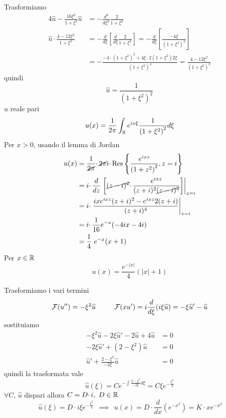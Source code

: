 Trasformiamo
\begin{align*}
4\hat{u} -\frac{16\xi ^{2}}{1+\xi ^{2}}\hat{u} & =-\frac{d^{2}}{d\xi ^{2}}\frac{2}{1+\xi ^{2}}\\
\hat{u} \cdotp \frac{4-12\xi ^{2}}{1+\xi ^{2}} & =-\frac{d}{d\xi }\left[\frac{d}{d\xi }\frac{2}{1+\xi ^{2}}\right] =-\frac{d}{d\xi }\left[\frac{-4\xi }{\left( 1+\xi ^{2}\right)^{2}}\right]\\
 & =-\frac{-4\cdotp \left( 1+\xi ^{2}\right)^{2} +4\xi \cdotp 2\left( 1+\xi ^{2}\right) 2\xi }{\left( 1+\xi ^{2}\right)^{4}} =\frac{4-12\xi ^{2}}{\left( 1+\xi ^{2}\right)^{3}}
\end{align*}
quindi
\begin{equation*}
\hat{u} =\frac{1}{\left( 1+\xi ^{2}\right)^{2}}
\end{equation*}
$\hat{u}$ reale pari
\begin{equation*}
u( x) =\frac{1}{2\pi }\int _{\mathbb{R} } e^{ix\xi }\frac{1}{\left( 1+\xi ^{2}\right)^{2}} d\xi 
\end{equation*}
Per $x >0$, usando il lemma di Jordan
\begin{align*}
u( x) & =\frac{1}{\cancel{2\pi }} \cdotp \cancel{2\pi } i\cdotp \operatorname{Res} \left\{\frac{e^{ixz}}{\left( 1+z^{2}\right)^{2}} ,z=i\right\}\\
 & =i\cdotp \frac{d}{dz}\left. \left[\cancel{( z-i)^{2}} \cdotp \frac{e^{ixz}}{( z+i)^{2}\cancel{( z-i)^{2}}}\right]\right| _{z=i}\\
 & =i\cdotp \left. \frac{ixe^{ixz}( z+i)^{2} -e^{ixz} 2( z+i)}{( z+i)^{4}}\right| _{z=i}\\
 & =i\cdotp \frac{1}{16} e^{-x}( -4ix-4i)\\
 & =\frac{1}{4} \ e^{-x}( x+1)
\end{align*}
Per $x\in \mathbb{R} $
\begin{equation*}
u( x) =\frac{e^{-| x| }}{4}(| x| +1)
\end{equation*}
\Soluzione

Trasformiamo i vari termini
\begin{equation*}
\mathcal{F} ( u'') =-\xi ^{2}\widehat{u} \ \ \ \ \ \ \ \ \mathcal{F} ( xu') =i\frac{d}{d\xi }( i\xi \widehat{u}) =-\xi \widehat{u} '-\widehat{u}
\end{equation*}
sostituiamo
\begin{align*}
-\xi ^{2}\hat{u} -2\xi \hat{u} '-2\hat{u} +4\hat{u} & =0\\
-2\xi \hat{u} '+\left( 2-\xi ^{2}\right)\hat{u} & =0\\
\hat{u} '+\frac{2-\xi ^{2}}{-2\xi }\hat{u} & =0
\end{align*}
quindi la trasformata vale
\begin{equation*}
\hat{u}( \xi ) =Ce^{-\int \frac{2-\xi ^{2}}{-2\xi } d\xi } =C\xi e^{-\frac{\xi ^{2}}{4}}
\end{equation*}
$\forall C$, $\hat{u}$ dispari allora $C=D\cdotp i,\ D\in \mathbb{R} $
\begin{equation*}
\ \hat{u}( \xi ) =D\cdotp i\xi e^{-\frac{\xi ^{2}}{4}} \ \ \implies \ \ u( x) =D\cdotp \frac{d}{dx}\left( e^{-x^{2}}\right) =K\cdotp xe^{-x^{2}}
\end{equation*}
